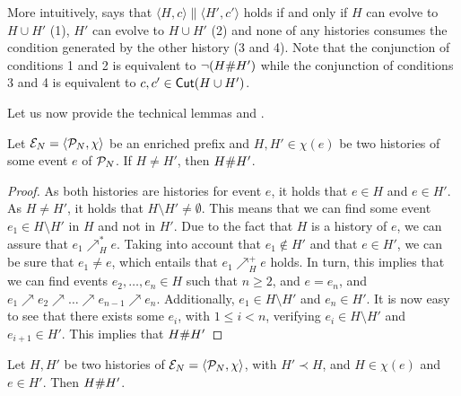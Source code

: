 More intuitively,  says that $\langle H, c\rangle \parallel
\langle H', c' \rangle$ holds if and only if $H$ can evolve to $H \cup H' $
(1), $H'$ can evolve to $H \cup H'$ (2) and none of any histories consumes the
condition generated by the other history (3 and 4).  Note that the conjunction
of conditions 1 and 2 is equivalent to $\lnot (H \mathord{\#} H')$ while the
conjunction of conditions 3 and 4 is equivalent to $c, c' \in \mathsf{Cut }{(H \cup H')}$.

Let us now provide the technical lemmas  and .

\setcounter{theorem}{21}
\begin{lemma}
\label{lem:let.H}
Let $\mathcal{E}_{N} = \langle \mathcal{P}_{N}, \chi \rangle$ be an enriched prefix and $H, H'
\in \chi (e)$ be two histories of some event $e$ of $\mathcal{P}_{N}$.  If $H \not=
H'$, then $H \mathord{\#} H'$.
\end{lemma}

\begin{proof}
As both histories are histories for event $e$, it holds that $e \in H$ and $e
\in H'$.  As $H \ne H'$, it holds that $H \setminus H' \ne \emptyset$.  This
means that we can find some event $e_1 \in H \setminus H'$ in $H$ and not in
$H'$.  Due to the fact that $H$ is a history of $e$, we can assure that $e_1
\nearrow^*_H e$.  Taking into account that $e_1 \notin H'$ and that $e \in H'$,
we can be sure that $e_1 \ne e$, which entails that $e_1 \nearrow^+_H e$ holds.
In turn, this implies that we can find events $e_2, \ldots, e_n \in H$ such
that $n \ge 2$, and $e = e_n$, and $e_1 \nearrow e_2 \nearrow \ldots \nearrow
e_{n-1} \nearrow e_n$.  Additionally, $e_1 \in H \setminus H'$ and $e_n \in
H'$.  It is now easy to see that there exists some $e_i$, with $1 \le i < n$,
verifying $e_i \in H \setminus H'$ and $e_{i+1} \in H'$.  This implies that $H
\mathord{\#} H'$
\end{proof}

\setcounter{theorem}{22}
\begin{lemma}
\label{lem:two.histories}
Let $H, H'$ be two histories of $\mathcal{E}_{N} = \langle \mathcal{P}_{N}, \chi \rangle$, with
$H' \prec H$, and $H \in \chi (e)$ and $e \in H'$.  Then $H \mathord{\#} H'$.
\end{lemma}

